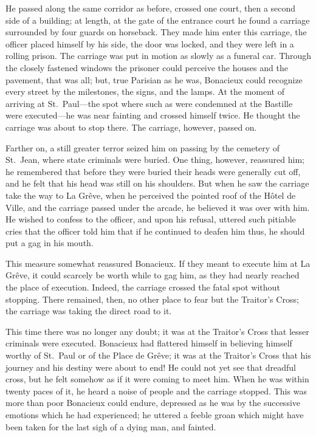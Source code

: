 He passed along the same corridor as before, crossed one court, then a second side of a building; at length, at the gate of the entrance court he found a carriage surrounded by four guards on horseback. They made him enter this carriage, the officer placed himself by his side, the door was locked, and they were left in a rolling prison. The carriage was put in motion as slowly as a funeral car. Through the closely fastened windows the prisoner could perceive the houses and the pavement, that was all; but, true Parisian as he was, Bonacieux could recognize every street by the milestones, the signs, and the lamps. At the moment of arriving at St.~Paul—the spot where such as were condemned at the Bastille were executed—he was near fainting and crossed himself twice. He thought the carriage was about to stop there. The carriage, however, passed on. 

Farther on, a still greater terror seized him on passing by the cemetery of St.~Jean, where state criminals were buried. One thing, however, reassured him; he remembered that before they were buried their heads were generally cut off, and he felt that his head was still on his shoulders. But when he saw the carriage take the way to La Grêve, when he perceived the pointed roof of the Hôtel de Ville, and the carriage passed under the arcade, he believed it was over with him. He wished to confess to the officer, and upon his refusal, uttered such pitiable cries that the officer told him that if he continued to deafen him thus, he should put a gag in his mouth. 

This measure somewhat reassured Bonacieux. If they meant to execute him at La Grêve, it could scarcely be worth while to gag him, as they had nearly reached the place of execution. Indeed, the carriage crossed the fatal spot without stopping. There remained, then, no other place to fear but the Traitor's Cross; the carriage was taking the direct road to it. 

This time there was no longer any doubt; it was at the Traitor's Cross that lesser criminals were executed. Bonacieux had flattered himself in believing himself worthy of St.~Paul or of the Place de Grêve; it was at the Traitor's Cross that his journey and his destiny were about to end! He could not yet see that dreadful cross, but he felt somehow as if it were coming to meet him. When he was within twenty paces of it, he heard a noise of people and the carriage stopped. This was more than poor Bonacieux could endure, depressed as he was by the successive emotions which he had experienced; he uttered a feeble groan which might have been taken for the last sigh of a dying man, and fainted.